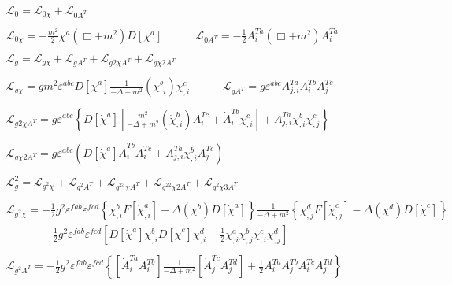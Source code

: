 \documentclass{article}
\begin{document}
\begin{equation*}
    \begin{split}
        &\mathcal{L}_0=\mathcal{L}_{0\chi}+\mathcal{L}_{0A^T}\\\\
        &\mathcal{L}_{0\chi}=-\frac{m^2}{2}\chi^a(\Box+m^2)D[\chi^a]\quad\quad\quad
        \mathcal{L}_{0A^T}=-\frac{1}{2}A_i^{Ta}(\Box+m^2)A_i^{Ta}\\\\
        &\mathcal{L}_g=\mathcal{L}_{g\chi}+\mathcal{L}_{gA^T}+\mathcal{L}_{g2\chi A^T}+\mathcal{L}_{g\chi 2A^T}\\\\
        &\mathcal{L}_{g\chi}=gm^2\varepsilon^{abc}D[\dot{\chi}^a]\frac{1}{-\Delta+m^2}\left(\dot{\chi}^b_{,i}\right)\chi^c_{,i}\quad\quad\quad
        \mathcal{L}_{gA^T}=g\varepsilon^{abc}A_{j,i}^{Ta}A_i^{Tb}A_j^{Tc}\\\\
        &\mathcal{L}_{g2\chi A^T}=g\varepsilon^{abc}\left\{D[\dot{\chi}^a]\left[  \frac{m^2}{-\Delta+m^2}\left(\dot{\chi}^b_{,i}\right)A_i^{Tc}+\dot{A}_i^{Tb}\chi^c_{,i}\right] +A_{j,i}^{Ta}\chi^b_{,i}\chi^c_{,j} \right\} \\\\
        &\mathcal{L}_{g\chi2A^T}=g\varepsilon^{abc}\left(D[\dot{\chi}^a]\dot{A}_i^{Tb}A_i^{Tc}+A_{j,i}^{Ta}\chi^b_{,i}A_j^{Tc}\right)\\\\
        &\mathcal{L}_g^2=\mathcal{L}_{g^2\chi}+\mathcal{L}_{g^2A^T}+\mathcal{L}_{g^23\chi A^T}+\mathcal{L}_{g^22\chi2A^T}+\mathcal{L}_{g^2\chi3A^T}\\\\
        &\mathcal{L}_{g^2\chi}=-\frac{1}{2}g^2\varepsilon^{fab}\varepsilon^{fcd}\left\{\chi_{,i}^bF[\dot{\chi}^a_{,i}]-\Delta(\chi^b)D[\dot{\chi}^a]\right\}\frac{1}{-\Delta+m^2}\left\{\chi_{,j}^dF[\dot{\chi}^c_{,j}]-\Delta(\chi^d)D[\dot{\chi}^c]\right\}\\
        &\quad\quad\quad+\frac{1}{2}g^2\varepsilon^{fab}\varepsilon^{fcd}\left[D[\dot{\chi}^a]\chi_{,i}^bD[\dot{\chi}^c]\chi_{,i}^d-\frac{1}{2}\chi_{,i}^a\chi_{,j}^b\chi_{,i}^c\chi_{,j}^d\right]\\\\
        &\mathcal{L}_{g^2A^T}=-\frac{1}{2}g^2\varepsilon^{fab}\varepsilon^{fcd}\left\{\left[\dot{A}_i^{Ta}A^{Tb}_i\right]\frac{1}{-\Delta+m^2}\left[\dot{A}_j^{Tc}A^{Td}_j\right]+\frac{1}{2}A_i^{Ta}A_j^{Tb}A_i^{Tc}A_j^{Td}\right\}\\\\

\end{split}
\end{equation*}
\end{document}
